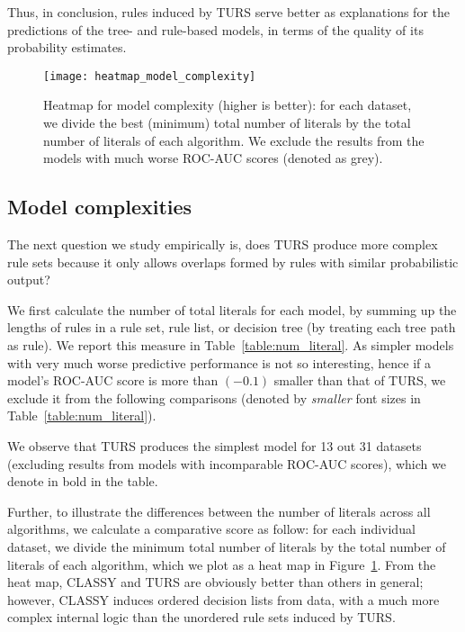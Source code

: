 
Thus, in conclusion, rules induced by TURS serve better as explanations for the predictions of the tree- and rule-based models, in terms of the quality of its probability estimates. 

%


\begin{figure}[ht]
	\texttt{[image: heatmap\_model\_complexity]}
	\caption{Heatmap for model complexity (higher is better): for each dataset, we divide the best (minimum) total number of literals by the total number of literals of each algorithm. We exclude the results from the models with much worse ROC-AUC scores (denoted as grey).}	 
	\label{fig:heatmap_modelcomplexity}
\end{figure}

\subsection{Model complexities}
The next question we study empirically is, does TURS produce more complex rule sets because it only allows overlaps formed by rules with similar probabilistic output? 

We first calculate the number of total literals for each model, by summing up the lengths of rules in a rule set, rule list, or decision tree (by treating each tree path as rule). 
We report this measure in Table~\ref{table:num_literal}. As simpler models with very much worse predictive performance is not so interesting, hence if a model's ROC-AUC score is more than $(-0.1)$ smaller than that of TURS, we exclude it from the following comparisons (denoted by \emph{smaller} font sizes in Table~\ref{table:num_literal}). 

We observe that TURS produces the simplest model for 13 out 31 datasets (excluding results from models with incomparable ROC-AUC scores), which we denote in bold in the table. 

Further, to illustrate the differences between the number of literals across all algorithms, we calculate a comparative score as follow: for each individual dataset, we divide the minimum total number of literals by the total number of literals of each algorithm, which we plot as a heat map in Figure~\ref{fig:heatmap_modelcomplexity}. From the heat map, CLASSY and TURS are obviously better than others in general; however, CLASSY induces ordered decision lists from data, with a much more complex internal logic than the unordered rule sets induced by TURS. 

